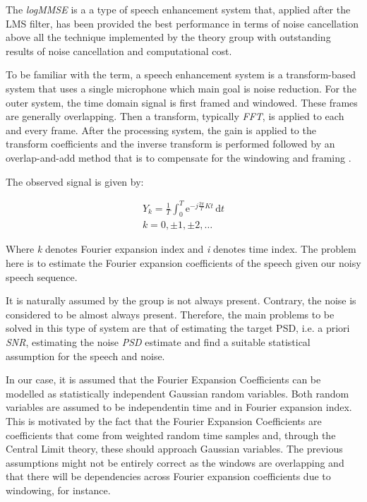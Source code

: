 \documentclass[11pt,a4paper,english]{book}  %
\theoremstyle{definition}  %
\theoremstyle{plain}  %
\theoremstyle{remark}  %
\begin{document}
The \textit{logMMSE} is a a type of speech enhancement system that, applied after the LMS filter, has been provided the best performance in terms of noise cancellation above all the technique implemented by the theory group with outstanding results of noise cancellation and computational cost.
	
	To be familiar with the term, a speech enhancement system is a transform-based system that uses a single microphone which main goal is noise reduction. For the outer system, the time domain signal is first framed and windowed.  These frames are generally overlapping. Then a transform, typically \textit{FFT}, is applied to each and every frame. After the processing system, the gain is applied to the transform coefficients and the inverse transform is performed followed by an overlap-and-add method that is to compensate for the windowing and framing \cite{speech}.

	
	The observed signal is given by:

	\begin{subequations}
	\label{eq:speech1}
	\begin{align}
	Y_{k}=\frac{1}{T} \int_0^T \mathrm{e}^{-j \frac{2\pi}{T} Kt}\,\mathrm{d}t\\
	k=0, \pm 1, \pm 2, \dots	
	\end{align}
	
	\end{subequations}
	
	
	Where \textit{k} denotes Fourier expansion index and \textit{i} denotes time index. The problem here is to estimate the Fourier expansion coefficients of the speech given our noisy speech sequence.

It is naturally assumed by the group is not always present. Contrary, the noise is considered to be almost always present. Therefore, the main problems to be solved in this type of system are that of estimating the target PSD, i.e. a priori \textit{SNR}, estimating the noise \textit{PSD} estimate and find a suitable statistical assumption for the speech and noise.


In our case, it is assumed that the Fourier Expansion Coefficients can be modelled as statistically independent Gaussian random variables. Both random variables are assumed to be independentin time and in Fourier expansion index. This is motivated by the fact that the Fourier Expansion Coefficients are coefficients that come from weighted random time samples and, through the Central Limit theory, these should approach Gaussian variables. The previous assumptions might not be entirely correct as the windows are overlapping and that there will be dependencies across Fourier expansion coefficients due to windowing, for instance.
\end{document}
